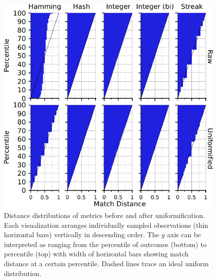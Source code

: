 \begin{figure}[!htbp]
\begin{center}

\includegraphics[width=\columnwidth]{img/uniformification/bitweight=0dot5+seed=1+title=low-score-distribution+_data_hathash_hash=75684cf1e73fb7f1+_script_fullcat_hash=c3113c80efb02374+ext=}
\caption{
Distance distributions of metrics before and after uniformification.
Each visualization arranges individually sampled observations (thin horizontal bars) vertically in descending order.
The $y$ axis can be interpreted as ranging from the  percentile of outcomes (bottom) to  percentile (top) with width of horizontal bars showing match distance at a certain percentile.
Dashed lines trace an ideal uniform distribution.
}
\label{fig:uniformification_supp}

\end{center}
\end{figure}
